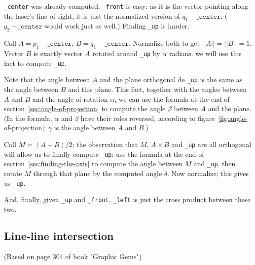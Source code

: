 \documentclass{article}
\newcommand\attribute[1]{\texttt{#1}}
\begin{document}
\attribute{\_center} was already computed.
\attribute{\_front} is easy: as it is the vector pointing along
the laser's line of sight,
it is just the normalized version of $q_1 - \attribute{\_center}$.
($q_2 - \attribute{\_center}$ would work just as well.)
Finding \attribute{\_up} is harder.

Call $A = p_1 - \attribute{\_center}$, $B = q_1 - \attribute{\_center}$.
Normalize both to get $||A|| = ||B|| = 1$.
Vector $B$ is exactly vector $A$ rotated around \attribute{\_up}
by $\alpha$ radians;
we will use this fact to compute \attribute{\_up}.

Note that the angle between $A$ and the plane orthogonal de \attribute{\_up}
is the same as the angle between $B$ and this plane.
This fact, together with the angles between $A$ and $B$
and the angle of rotation $\alpha$,
we can use the formula at the end of section~\ref{sec:angle-of-projection}
to compute the angle $\beta$ between $A$ and the plane.
(In the formula, $\alpha$ and $\beta$ have their roles reversed,
according to figure~\ref{fig:angle-of-projection};
$\gamma$ is the angle between $A$ and $B$.)

Call $M = (A + B)/2$; the observation that $M$,
$A \times B$ and \attribute{\_up} are all orthogonal
will allow us to finally compute \attribute{\_up}:
use the formula at the end of section~\ref{sec:finding-the-axis}
to compute the angle between $M$ and \attribute{\_up},
then rotate $M$ through that plane by the computed angle $\delta$.
Now normalize;
this gives us \attribute{\_up}.

And, finally, given \attribute{\_up} and \attribute{\_front},
\attribute{\_left} is just the cross product between these two.

\subsection{Line-line intersection}
\label{sec:line-line-intersection}

(Based on page 304 of book "Graphic Gems")
\end{document}
